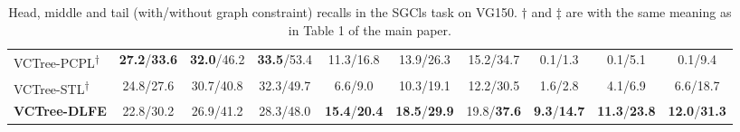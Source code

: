\documentclass[sigconf]{acmart}
\begin{document}
\begin{table*}[htbp]
{\begin{tabular}{l|c c c|c c c|c c c}
VCTree-PCPL\textsuperscript{$\dagger$} \cite{yan2020pcpl} & \textbf{27.2}/\textbf{33.6} & \textbf{32.0}/46.2 & \textbf{33.5}/53.4 & 11.3/16.8 & 13.9/26.3 & 15.2/34.7 & 0.1/1.3 & 0.1/5.1 & 0.1/9.4 \\
VCTree-STL\textsuperscript{$\dagger$} \cite{chen2019soft} & 24.8/27.6 & 30.7/40.8 & 32.3/49.7 & 6.6/9.0 & 10.3/19.1 & 12.2/30.5 & 1.6/2.8 & 4.1/6.9 & 6.6/18.7 \\
\textbf{VCTree-DLFE} & 22.8/30.2 & 26.9/41.2 & 28.3/48.0 & \textbf{15.4}/\textbf{20.4} & \textbf{18.5}/\textbf{29.9} & 19.8/\textbf{37.6} & \textbf{9.3}/\textbf{14.7} & \textbf{11.3}/\textbf{23.8} & \textbf{12.0}/\textbf{31.3} \\
\hline
\end{tabular}
}
\vspace{0.1em}
\caption{Head, middle and tail (with/without graph constraint) recalls in the SGCls task on VG150. $\dagger$ and $\ddagger$ are with the same meaning as in Table 1 of the main paper.
}
\label{tab:head_mid_tail_sgcls}
\end{table*}
\end{document}
